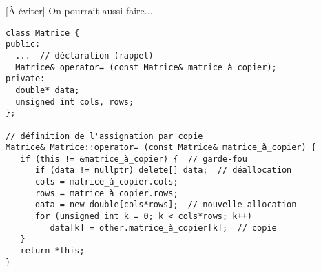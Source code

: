 \documentclass[c]{beamer}
\begin{document}

\begin{frame}[fragile]{[À éviter] On pourrait aussi faire...}

\begin{verbatim}
class Matrice {
public:
  ...  // déclaration (rappel)
  Matrice& operator= (const Matrice& matrice_à_copier);
private:
  double* data;
  unsigned int cols, rows;
};

// définition de l'assignation par copie
Matrice& Matrice::operator= (const Matrice& matrice_à_copier) {
   if (this != &matrice_à_copier) {  // garde-fou
      if (data != nullptr) delete[] data;  // déallocation
      cols = matrice_à_copier.cols;
      rows = matrice_à_copier.rows;
      data = new double[cols*rows];  // nouvelle allocation
      for (unsigned int k = 0; k < cols*rows; k++)
         data[k] = other.matrice_à_copier[k];  // copie
   }
   return *this;
}
\end{verbatim}

\end{frame}





\end{document}

